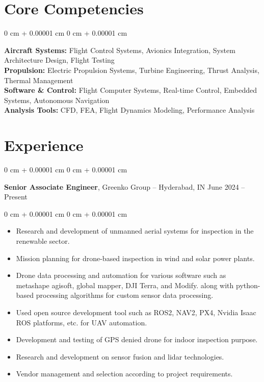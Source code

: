 \documentclass[10pt, letterpaper]{article}
\newenvironment{highlights}{
    \begin{itemize}[
        topsep=0.10 cm,
        parsep=0.10 cm,
        partopsep=0pt,
        itemsep=0pt,
        leftmargin=0 cm + 10pt
    ]
}{
    \end{itemize}
} %
\newenvironment{onecolentry}{
    \begin{adjustwidth}{
        0 cm + 0.00001 cm
    }{
        0 cm + 0.00001 cm
    }
}{
    \end{adjustwidth}
} %
\newenvironment{twocolentry}[2][]{
    \onecolentry
    \def\secondColumn{#2}
    \setcolumnwidth{\fill, 4.5 cm}
    \begin{paracol}{2}
}{
    \switchcolumn \raggedleft \secondColumn
    \end{paracol}
    \endonecolentry
} %
\begin{document}
   \section{Core Competencies}
    \begin{onecolentry}
        \textbf{Aircraft Systems:} Flight Control Systems, Avionics Integration, System Architecture Design, Flight Testing\\
        \textbf{Propulsion:} Electric Propulsion Systems, Turbine Engineering, Thrust Analysis, Thermal Management\\
        \textbf{Software \& Control:} Flight Computer Systems, Real-time Control, Embedded Systems, Autonomous Navigation\\
        \textbf{Analysis Tools:} CFD, FEA, Flight Dynamics Modeling, Performance Analysis
    \end{onecolentry}

        
    \section{Experience}
        
        \begin{twocolentry}{
            June 2024 – Present
        }
            \textbf{Senior Associate Engineer}, Greenko Group -- Hyderabad, IN\end{twocolentry}

        \vspace{0.10 cm}
        \begin{onecolentry}
            \begin{highlights}
                \item Research and development of unmanned aerial systems for inspection in the renewable sector.
                \item Mission planning for drone-based inspection in wind and solar power plants.
                \item Drone data processing and automation for various software such as metashape agisoft, global mapper, DJI Terra, and Modify. along with python-based processing algorithms for custom sensor data processing.  
                \item Used open source development tool such as ROS2, NAV2, PX4, Nvidia Isaac ROS platforms, etc. for UAV automation.
                \item Development and testing of GPS denied drone for indoor inspection purpose.
                \item Research and development on sensor fusion and lidar technologies.
                \item Vendor management and selection according to project requirements.
            \end{highlights}
        \end{onecolentry}
\end{document}
